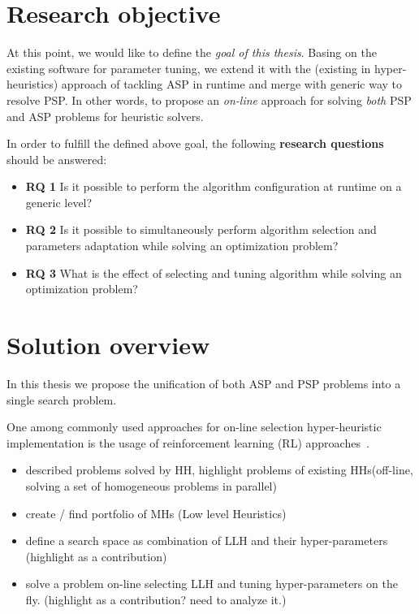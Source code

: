 \section{Research objective}
At this point, we would like to define the \emph{goal of this thesis}. Basing on the existing software for parameter tuning, we extend it with the (existing in hyper-heuristics) approach of tackling ASP in runtime and merge with generic way to resolve PSP. In other words, to propose an \emph{on-line} approach for solving \emph{both} PSP and ASP problems for heuristic solvers.

In order to fulfill the defined above goal, the following \textbf{research questions} should be answered:
\begin{itemize}
	\item \textbf{RQ 1} Is it possible to perform the algorithm configuration at runtime on a generic level?
	
	\item \textbf{RQ 2} Is it possible to simultaneously perform algorithm selection and parameters adaptation while solving an optimization problem?
	
	\item \textbf{RQ 3} What is the effect of selecting and tuning algorithm while solving an optimization problem?
\end{itemize}


\section{Solution overview}
In this thesis we propose the unification of both ASP and PSP problems into a single search problem. 






One among commonly used approaches for on-line selection hyper-heuristic implementation is the usage of reinforcement learning (RL) approaches~\cite{moriarty1999evolutionary,mcclymont2011markov}. 


\begin{itemize}
	\item described problems solved by HH, highlight problems of existing HHs(off-line, solving a set of homogeneous problems in parallel)
	\item create / find portfolio of MHs (Low level Heuristics)
	\item define a search space as combination of LLH and their hyper-parameters (highlight as a contribution)
	\item solve a problem on-line selecting LLH and tuning hyper-parameters on the fly. (highlight as a contribution? need to analyze it.)
\end{itemize}


